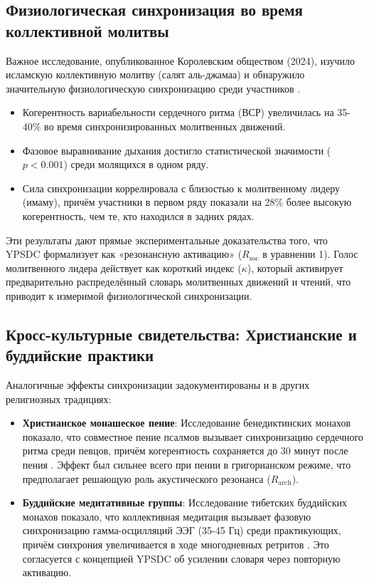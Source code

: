 \documentclass[12pt,a4paper]{article}
\begin{document}
	\subsection{Физиологическая синхронизация во время коллективной молитвы}
	
	Важное исследование, опубликованное Королевским обществом (2024), изучило исламскую коллективную молитву (салят аль-джамаа) и обнаружило значительную физиологическую синхронизацию среди участников \cite{RoyalSociety2024}.
	\begin{itemize}
		\item Когерентность вариабельности сердечного ритма (ВСР) увеличилась на 35-40\% во время синхронизированных молитвенных движений.
		\item Фазовое выравнивание дыхания достигло статистической значимости ($p < 0.001$) среди молящихся в одном ряду.
		\item Сила синхронизации коррелировала с близостью к молитвенному лидеру (имаму), причём участники в первом ряду показали на 28\% более высокую когерентность, чем те, кто находился в задних рядах.
	\end{itemize}
	
	Эти результаты дают прямые экспериментальные доказательства того, что YPSDC формализует как «резонансную активацию» ($R_{\mathrm{soc}}$ в уравнении 1). Голос молитвенного лидера действует как короткий индекс ($\kappa$), который активирует предварительно распределённый словарь молитвенных движений и чтений, что приводит к измеримой физиологической синхронизации.
	
	\subsection{Кросс-культурные свидетельства: Христианские и буддийские практики}
	
	Аналогичные эффекты синхронизации задокументированы и в других религиозных традициях:
	
	\begin{itemize}
		\item \textbf{Христианское монашеское пение}: Исследование бенедиктинских монахов показало, что совместное пение псалмов вызывает синхронизацию сердечного ритма среди певцов, причём когерентность сохраняется до 30 минут после пения \cite{Craswell2023}. Эффект был сильнее всего при пении в григорианском режиме, что предполагает решающую роль акустического резонанса ($R_{\mathrm{arch}}$).
		
		\item \textbf{Буддийские медитативные группы}: Исследование тибетских буддийских монахов показало, что коллективная медитация вызывает фазовую синхронизацию гамма-осцилляций ЭЭГ (35-45 Гц) среди практикующих, причём синхрония увеличивается в ходе многодневных ретритов \cite{Lutz2017}. Это согласуется с концепцией YPSDC об усилении словаря через повторную активацию.
	\end{itemize}
	
\end{document}
